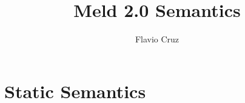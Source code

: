 \documentclass[11pt]{article}
\title{Meld 2.0 Semantics}
\author{Flavio Cruz}
\begin{document}
\newcommand{\trnstile}{\sststile{}{}}
\newcommand{\typ}[1]{\m{#1} \; \m{typ}}
\newcommand{\btyp}[1]{\m{#1} \; \m{btyp}}
\newcommand{\eexpr}[2]{\m{#1}:\m{#2}}
\newcommand{\aexp}[4]{#1;#2 \sststile{}{} \eexpr{#3}{#4}}
\newcommand{\expr}[3]{\aexp{\Psi}{#1}{#2}{#3}}
\newcommand{\tab}[0]{\;\;\;\;}
\newcommand{\elet}[3]{\m{let} \; #1 \; = \; #2 \; \m{in} \; #3 \; \m{end}}
\newcommand{\const}[2]{\m{const}(\mathit{#1}, #2)}
\newcommand{\getconst}[1]{\m{getconst}(\mathit{#1})}
\newcommand{\external}[2]{\m{external}(\mathit{#1}, #2)}
\newcommand{\callexternal}[2]{\m{callexternal}(\mathit{#1}, #2)}
\newcommand{\fun}[3]{\m{fun}(\mathit{#1}, #2, #3)}
\newcommand{\callfun}[2]{\m{callfun}(\mathit{#1}, #2)}
\newcommand{\decl}[2]{\m{decl} \; #1 \; [#2]}
\newcommand{\val}[2]{\m{val} \; #1 : \m{#2}}
\newcommand{\declconst}[3]{\const{#1}{#2} \; \m{of} \; #3}
\newcommand{\declfun}[4]{\fun{#1}{(#2)}{#3} \; \m{of} \; #4}
\newcommand{\eval}[2]{\Psi \; ; \; #1 \rightarrow #2}
\newcommand{\constraint}[1]{\m{constraint} \; #1}
\newcommand{\fact}[3]{#1[@#2](#3)}
\newcommand{\mif}[3]{\m{if} \; #1 \; \m{then} \; #2 \; \m{else} \; #3 \; \m{end}}
\newcommand{\mrule}[3]{\Psi ; #1 ; #2 \trnstile #3 \; \m{rule}}
\newcommand{\mrulebody}[4]{\Psi ; #1 ; #2 ; #3 \trnstile #4 \; \m{body}}
\newcommand{\mrulehead}[3]{\Psi ; #1 ; #2 \trnstile #3 \; \m{head}}
\newcommand{\mrulestart}[1]{\m{rule} \; \Psi \; / \; #1}
\newcommand{\comp}[0]{\m{comp} \; }
\newcommand{\aggregate}[4]{[\m{#1} ; #2 ; #3 \Rightarrow #4]}
\newcommand{\aggregatetype}[3]{[\m{#1}] \; / \; #2 \rightsquigarrow #3}
\newcommand{\changes}[6]{#1 ; #2 ; #3 ; #4 \Rightarrow #5 ; #6}
\newcommand{\changesb}[7]{#1 ; #2 ; #3 ; #4 \Rightarrow #5 ; #6 ; #7}
\newcommand{\apply}[5]{\m{apply} \; #1 ; #2 ; #3 \rightarrow #4 ; #5}
\newcommand{\applyb}[6]{\m{apply} \; #1 ; #2 ; #3 \rightarrow #4 ; #5 ; #6}
\newcommand{\derive}[8]{\m{derive} \; #1 ; #2 ; #3 ; #4 ; #5 ; #6 \rightarrow #7 ; #8}
\newcommand{\deriveb}[9]{\m{derive} \; #1 ; #2 ; #3 ; #4 ; #5 ; #6 \rightarrow #7 ; #8 ; #9}
\newcommand{\match}[4]{\m{match} \; #1 ; #2 ; #3 \rightarrow #4}
\newcommand{\equal}[2]{#1 = #2}
\newcommand{\at}[2]{#1 \; @ \; #2}

\maketitle

\section{Static Semantics}
\end{document}
